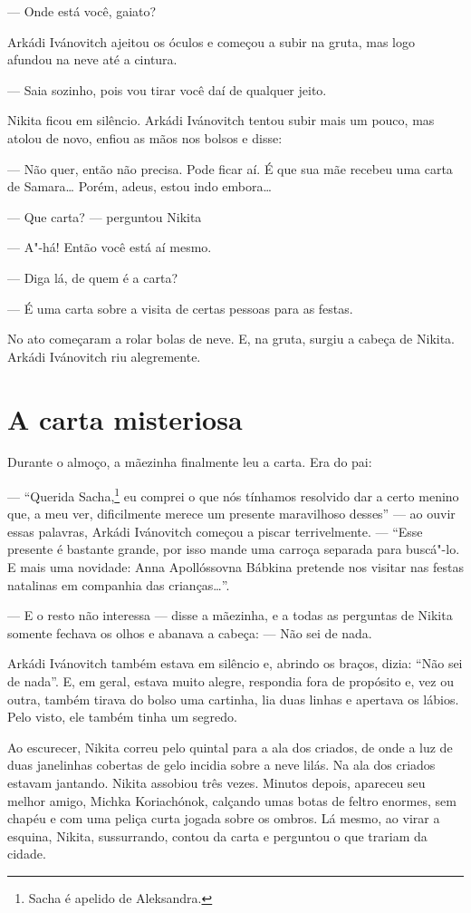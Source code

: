 --- Onde está você, gaiato?

Arkádi Ivánovitch ajeitou os óculos e começou a subir na gruta, mas logo
afundou na neve até a cintura.

--- Saia sozinho, pois vou tirar você daí de qualquer jeito.

Nikita ficou em silêncio. Arkádi Ivánovitch tentou subir mais um pouco,
mas atolou de novo, enfiou as mãos nos bolsos e disse:

--- Não quer, então não precisa. Pode ficar aí. É que sua mãe recebeu
uma carta de Samara\ldots{} Porém, adeus, estou indo embora\ldots{}

--- Que carta? --- perguntou Nikita

--- A"-há! Então você está aí mesmo.

--- Diga lá, de quem é a carta?

--- É uma carta sobre a visita de certas pessoas para as festas.

No ato começaram a rolar bolas de neve. E, na gruta, surgiu a cabeça de
Nikita. Arkádi Ivánovitch riu alegremente.

\chapter{A carta misteriosa}

Durante o almoço, a mãezinha finalmente leu a carta. Era do pai:

--- ``Querida Sacha,\footnote{Sacha é apelido de Aleksandra.} eu comprei
o que nós tínhamos resolvido dar a certo menino que, a meu ver,
dificilmente merece um presente maravilhoso desses'' --- ao ouvir essas
palavras, Arkádi Ivánovitch começou a piscar terrivelmente. --- ``Esse
presente é bastante grande, por isso mande uma carroça separada para
buscá"-lo. E mais uma novidade: Anna Apollóssovna Bábkina pretende nos
visitar nas festas natalinas em companhia das crianças\ldots{}''.

--- E o resto não interessa --- disse a mãezinha, e a todas as perguntas
de Nikita somente fechava os olhos e abanava a cabeça: --- Não sei de
nada.

Arkádi Ivánovitch também estava em silêncio e, abrindo os braços, dizia:
``Não sei de nada''. E, em geral, estava muito alegre, respondia fora de
propósito e, vez ou outra, também tirava do bolso uma cartinha, lia duas
linhas e apertava os lábios. Pelo visto, ele também tinha um segredo.

Ao escurecer, Nikita correu pelo quintal para a ala dos criados, de onde
a luz de duas janelinhas cobertas de gelo incidia sobre a neve lilás. Na
ala dos criados estavam jantando. Nikita assobiou três vezes. Minutos
depois, apareceu seu melhor amigo, Michka Koriachónok, calçando umas
botas de feltro enormes, sem chapéu e com uma peliça curta jogada sobre
os ombros. Lá mesmo, ao virar a esquina, Nikita, sussurrando, contou da
carta e perguntou o que trariam da cidade.

